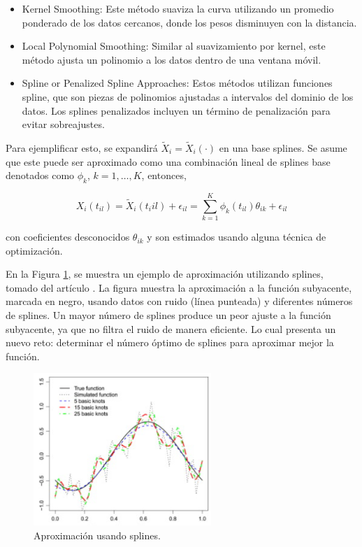 \begin{itemize}
    \item Kernel Smoothing: Este método suaviza la curva utilizando un promedio ponderado de los datos cercanos, donde los pesos disminuyen con la distancia.

    \item Local Polynomial Smoothing: Similar al suavizamiento por kernel, este método ajusta un polinomio a los datos dentro de una ventana móvil. 

    \item Spline or Penalized Spline Approaches: Estos métodos utilizan funciones spline, que son piezas de polinomios ajustadas a intervalos del dominio de los datos. Los splines penalizados incluyen un término de penalización para evitar sobreajustes.
\end{itemize}

Para ejemplificar esto, se expandirá $\widetilde{X}_i = \widetilde{X}_i(\cdot)$ en una base splines. Se asume que este puede ser aproximado como una combinación lineal de splines base denotados como $\phi_{k}$, $k = 1, \dots, K$, entonces,

\begin{equation}
     X_i(t_{il}) = \widetilde{X}_i(t_i{il}) + \epsilon_{il} = \sum_{k = 1}^{K}\phi_k(t_{il})\theta_{ik} + \epsilon_{il}
\end{equation}

con coeficientes desconocidos $\theta_{ik}$ y son estimados usando alguna técnica de optimización. 

En la Figura \ref{fig:ejSpline}, se muestra un ejemplo de aproximación utilizando splines, tomado del artículo \cite{Aguilera2013}. La figura muestra la aproximación a la función subyacente, marcada en negro, usando datos con ruido (línea punteada) y diferentes números de splines. Un mayor número de splines produce un peor ajuste a la función subyacente, ya que no filtra el ruido de manera eficiente. Lo cual presenta un nuevo reto: determinar el número óptimo de splines para aproximar mejor la función.

\begin{figure}[H]
    \centering
    \includegraphics[width = 0.6\textwidth ]{Imagenes/splineEj.png}
    \caption{Aproximación usando splines.}
    \label{fig:ejSpline}
\end{figure}

